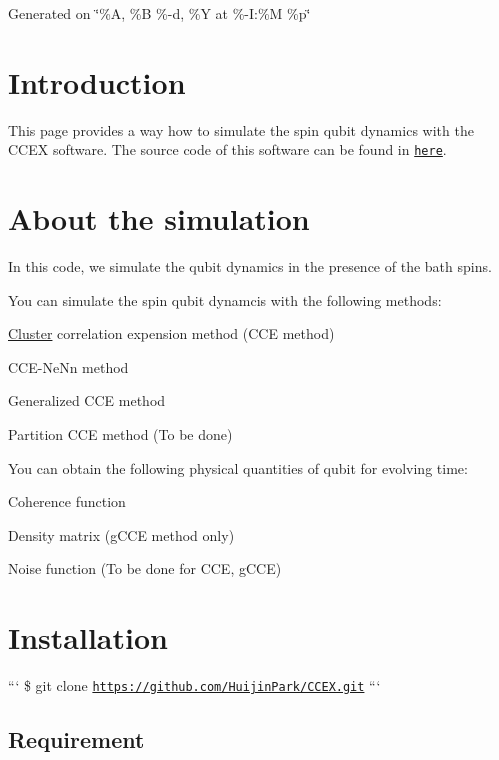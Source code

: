 Generated on  \char`\"{}\%\-A, \%\-B \%-\/d, \%\-Y at \%-\/\-I\-:\%\-M \%p\char`\"{}

\section*{Introduction }

This page provides a way how to simulate the spin qubit dynamics with the C\-C\-E\-X software. The source code of this software can be found in \href{https://github.com/HuijinPark/CCEX}{\tt here}.

\section*{About the simulation }

In this code, we simulate the qubit dynamics in the presence of the bath spins.

You can simulate the spin qubit dynamcis with the following methods\-:
\begin{DoxyItemize}
\item \hyperlink{structCluster}{Cluster} correlation expension method (C\-C\-E method)
\item C\-C\-E-\/\-Ne\-Nn method
\item Generalized C\-C\-E method
\item Partition C\-C\-E method (To be done)
\end{DoxyItemize}

You can obtain the following physical quantities of qubit for evolving time\-:
\begin{DoxyItemize}
\item Coherence function
\item Density matrix (g\-C\-C\-E method only)
\item Noise function (To be done for C\-C\-E, g\-C\-C\-E)
\end{DoxyItemize}

\section*{Installation }

``` \$ git clone \href{https://github.com/HuijinPark/CCEX.git}{\tt https\-://github.\-com/\-Huijin\-Park/\-C\-C\-E\-X.\-git} ```

\subsection*{Requirement}

